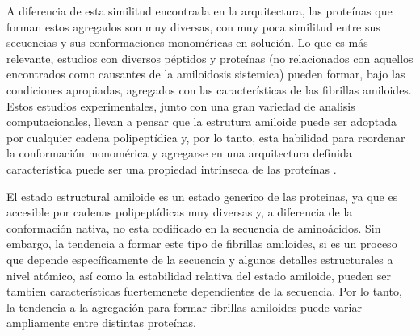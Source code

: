 
A diferencia de esta similitud encontrada en la arquitectura, las proteínas que forman estos agregados son muy diversas, con muy poca similitud entre sus secuencias y sus conformaciones monoméricas en solución.
Lo que es más relevante, estudios con diversos péptidos y proteínas (no relacionados con aquellos encontrados como causantes de la amiloidosis sistemica) pueden formar, bajo las condiciones apropiadas, agregados con las 
características de las fibrillas amiloides.
Estos estudios experimentales, junto con una gran variedad de analisis computacionales, llevan a pensar que la estrutura amiloide puede ser adoptada por cualquier cadena polipeptídica y, por lo tanto, 
esta habilidad para reordenar la conformación monomérica y agregarse en una arquitectura definida característica puede ser una propiedad intrínseca de las proteínas
\cite{fandrich2002behaviour}.

El estado estructural amiloide es un estado generico de las proteinas, ya que es accesible por cadenas polipeptídicas muy diversas y, a diferencia de la conformación nativa, no esta codificado en la secuencia de aminoácidos.
Sin embargo, la tendencia a formar este tipo de fibrillas amiloides, si es un proceso que depende específicamente de la secuencia y algunos detalles estructurales a nivel atómico, así como la estabilidad relativa del estado amiloide, 
pueden ser tambien características fuertemenete dependientes de la secuencia.  
Por lo tanto, la tendencia a la agregación para formar fibrillas amiloides puede variar ampliamente entre distintas proteínas. 




